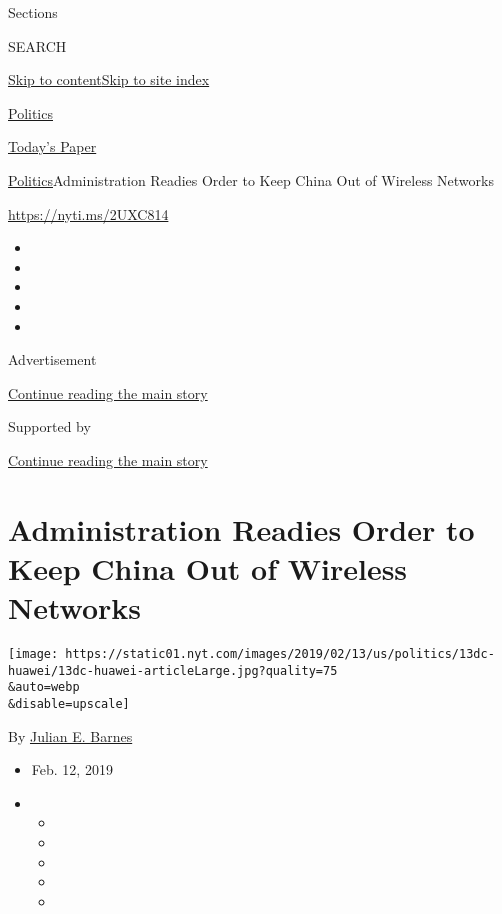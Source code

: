 Sections

SEARCH

\protect\hyperlink{site-content}{Skip to
content}\protect\hyperlink{site-index}{Skip to site index}

\href{https://www.nytimes.com/section/politics}{Politics}

\href{https://myaccount.nytimes.com/auth/login?response_type=cookie\&client_id=vi}{}

\href{https://www.nytimes.com/section/todayspaper}{Today's Paper}

\href{/section/politics}{Politics}\textbar{}Administration Readies Order
to Keep China Out of Wireless Networks

\url{https://nyti.ms/2UXC814}

\begin{itemize}
\item
\item
\item
\item
\item
\end{itemize}

Advertisement

\protect\hyperlink{after-top}{Continue reading the main story}

Supported by

\protect\hyperlink{after-sponsor}{Continue reading the main story}

\hypertarget{administration-readies-order-to-keep-china-out-of-wireless-networks}{%
\section{Administration Readies Order to Keep China Out of Wireless
Networks}\label{administration-readies-order-to-keep-china-out-of-wireless-networks}}

\texttt{[image: https://static01.nyt.com/images/2019/02/13/us/politics/13dc-huawei/13dc-huawei-articleLarge.jpg?quality=75\\\&auto=webp\\\&disable=upscale]}

By \href{https://www.nytimes.com/by/julian-e-barnes}{Julian E. Barnes}

\begin{itemize}
\item
  Feb. 12, 2019
\item
  \begin{itemize}
  \item
  \item
  \item
  \item
  \item
  \end{itemize}
\end{itemize}


